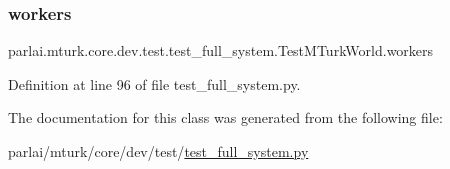 \subsubsection{\texorpdfstring{workers}{workers}}
{\footnotesize\ttfamily parlai.\+mturk.\+core.\+dev.\+test.\+test\+\_\+full\+\_\+system.\+Test\+M\+Turk\+World.\+workers}



Definition at line 96 of file test\+\_\+full\+\_\+system.\+py.



The documentation for this class was generated from the following file\+:\begin{DoxyCompactItemize}
\item 
parlai/mturk/core/dev/test/\hyperlink{dev_2test_2test__full__system_8py}{test\+\_\+full\+\_\+system.\+py}\end{DoxyCompactItemize}
